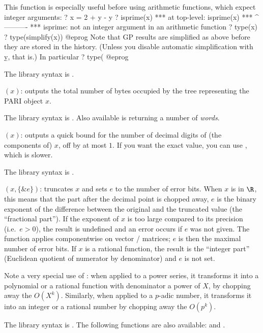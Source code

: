 This function is especially useful before using arithmetic functions,
which expect integer arguments:
\bprog
? x = 2 + y - y
? isprime(x)
  ***   at top-level: isprime(x)
  ***                 ^----------
  *** isprime: not an integer argument in an arithmetic function
? type(x)
? type(simplify(x))
@eprog
Note that GP results are simplified as above before they are stored in the
history. (Unless you disable automatic simplification with \b{y}, that is.)
In particular
\bprog
? type(%
@eprog

The library syntax is .

$(x)$: \label{se:sizebyte}outputs the total number of bytes occupied by the tree representing the
PARI object $x$.

The library syntax is .
Also available is  returning a
number of \emph{words}.

$(x)$: \label{se:sizedigit}
outputs a quick bound for the number of decimal
digits of (the components of) $x$, off by at most $1$. If you want the
exact value, you can use , which is slower.

The library syntax is .

$(x,\{\&e\})$: \label{se:truncate}truncates $x$ and sets $e$ to the number of
error bits. When $x$ is in $\R$, this means that the part after the decimal
point is chopped away, $e$ is the binary exponent of the difference between
the original and the truncated value (the ``fractional part''). If the
exponent of $x$ is too large compared to its precision (i.e.~$e>0$), the
result is undefined and an error occurs if $e$ was not given. The function
applies componentwise on vector / matrices; $e$ is then the maximal number of
error bits. If $x$ is a rational function, the result is the ``integer part''
(Euclidean quotient of numerator by denominator) and $e$ is not set.

Note a very special use of : when applied to a power series, it
transforms it into a polynomial or a rational function with denominator
a power of $X$, by chopping away the $O(X^k)$. Similarly, when applied to
a $p$-adic number, it transforms it into an integer or a rational number
by chopping away the $O(p^k)$.

The library syntax is .
The following functions are also available: 
and .

